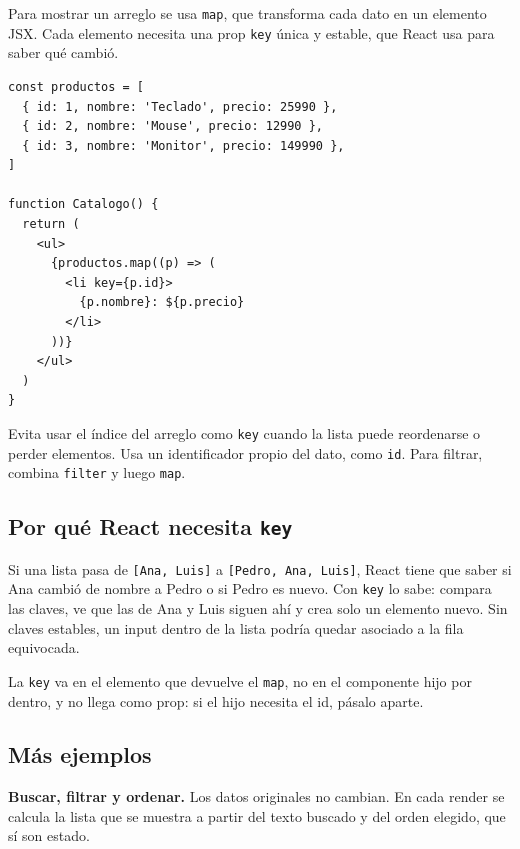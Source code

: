 \documentclass[11pt,a4paper]{article}
\newcommand{\cmd}[1]{\texttt{\color{reactdark}#1}}
\begin{document}
Para mostrar un arreglo se usa \cmd{map}, que transforma cada dato en un elemento JSX. Cada elemento necesita una prop \cmd{key} única y estable, que React usa para saber qué cambió.

\begin{lstlisting}[language=JSX]
const productos = [
  { id: 1, nombre: 'Teclado', precio: 25990 },
  { id: 2, nombre: 'Mouse', precio: 12990 },
  { id: 3, nombre: 'Monitor', precio: 149990 },
]

function Catalogo() {
  return (
    <ul>
      {productos.map((p) => (
        <li key={p.id}>
          {p.nombre}: ${p.precio}
        </li>
      ))}
    </ul>
  )
}
\end{lstlisting}

\begin{nota}
Evita usar el índice del arreglo como \cmd{key} cuando la lista puede reordenarse o perder elementos. Usa un identificador propio del dato, como \cmd{id}. Para filtrar, combina \cmd{filter} y luego \cmd{map}.
\end{nota}

\subsection{Por qué React necesita \texttt{key}}

Si una lista pasa de \cmd{[Ana, Luis]} a \cmd{[Pedro, Ana, Luis]}, React tiene que saber si Ana cambió de nombre a Pedro o si Pedro es nuevo. Con \cmd{key} lo sabe: compara las claves, ve que las de Ana y Luis siguen ahí y crea solo un elemento nuevo. Sin claves estables, un input dentro de la lista podría quedar asociado a la fila equivocada.

La \cmd{key} va en el elemento que devuelve el \cmd{map}, no en el componente hijo por dentro, y no llega como prop: si el hijo necesita el id, pásalo aparte.

\subsection{Más ejemplos}

\textbf{Buscar, filtrar y ordenar.} Los datos originales no cambian. En cada render se calcula la lista que se muestra a partir del texto buscado y del orden elegido, que sí son estado.
\end{document}
